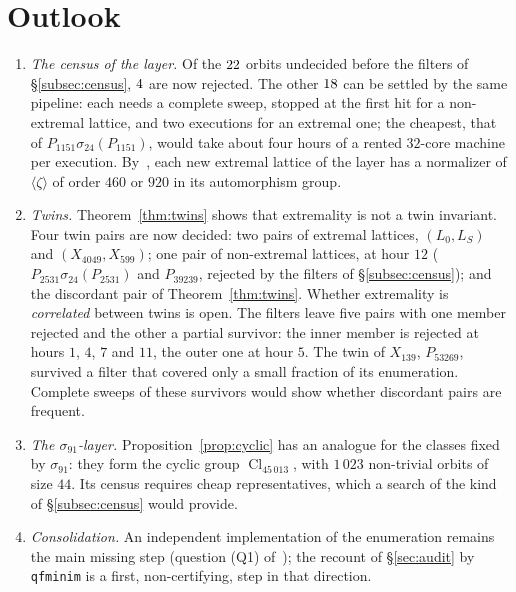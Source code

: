 \documentclass[11pt,a4paper]{amsart}
\theoremstyle{plain}
\theoremstyle{definition}
\DeclareMathOperator{\Cl}{Cl}
\newcommand{\Lz}{L_{0}}
\newcommand{\LS}{L_{S}}
\begin{document}
\section{Outlook}\label{sec:outlook}
\begin{enumerate}[label=\textup{(\arabic*)}]
\item \emph{The census of the layer.} Of the $22$ orbits undecided before the filters of \S\ref{subsec:census}, $4$ are now rejected. The other $18$ can be settled by the same pipeline: each needs a complete sweep, stopped at the first hit for a non-extremal lattice, and two executions for an extremal one; the cheapest, that of $P_{1151}\sigma_{24}(P_{1151})$, would take about four hours of a rented $32$-core machine per execution. By~\cite[Rem.~2.6]{Gau26}, each new extremal lattice of the layer has a normalizer of $\langle\zeta\rangle$ of order $460$ or $920$ in its automorphism group.
\item \emph{Twins.} Theorem~\ref{thm:twins} shows that extremality is not a twin invariant. Four twin pairs are now decided: two pairs of extremal lattices, $(\Lz,\LS)$ and $(X_{4049},X_{599})$; one pair of non-extremal lattices, at hour $12$ ($P_{2531}\sigma_{24}(P_{2531})$ and $P_{39239}$, rejected by the filters of \S\ref{subsec:census}); and the discordant pair of Theorem~\ref{thm:twins}. Whether extremality is \emph{correlated} between twins is open. The filters leave five pairs with one member rejected and the other a partial survivor: the inner member is rejected at hours $1$, $4$, $7$ and $11$, the outer one at hour $5$. The twin of $X_{139}$, $P_{53269}$, survived a filter that covered only a small fraction of its enumeration. Complete sweeps of these survivors would show whether discordant pairs are frequent.
\item \emph{The $\sigma_{91}$-layer.} Proposition~\ref{prop:cyclic} has an analogue for the classes fixed by $\sigma_{91}$: they form the cyclic group $\Cl_{45\,013}$, with $1\,023$ non-trivial orbits of size $44$. Its census requires cheap representatives, which a search of the kind of \S\ref{subsec:census} would provide.
\item \emph{Consolidation.} An independent implementation of the enumeration remains the main missing step (question (Q1) of~\cite{Gau26}); the recount of \S\ref{sec:audit} by \texttt{qfminim} is a first, non-certifying, step in that direction.
\end{enumerate}
\end{document}

